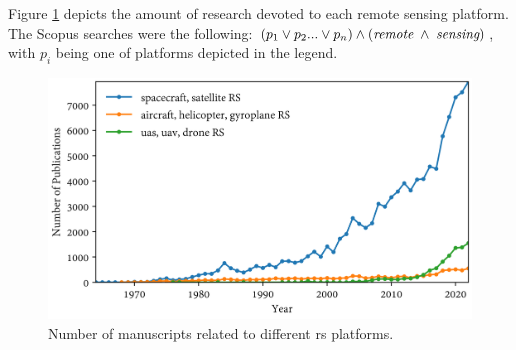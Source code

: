 Figure \ref{fig:scopus_search_platforms} depicts the amount of research devoted to each remote sensing platform. The Scopus searches were the following: $(p_1 \lor p_2 ... \lor p_n) \land (\textit{remote} \hspace{1mm} \land \hspace{1mm} \textit{sensing})$, with $p_i$ being one of platforms depicted in the legend. 

\begin{figure}[!ht]
	\includegraphics[width=\linewidth]{figs/introduction/platform_timeline.png}
	\caption{Number of manuscripts related to different \acrshort{rs} platforms. }
    \label{fig:scopus_search_platforms}
\end{figure}

